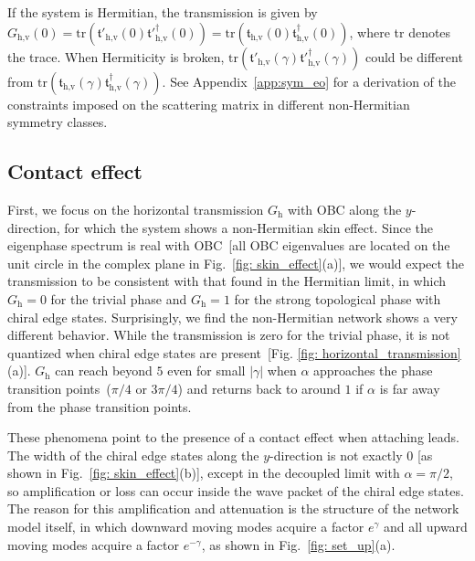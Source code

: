 \documentclass[aps,pra,reprint,superscriptaddress,showkeys,amsmath,amssymb,longbibliography]{revtex4-1}
\begin{document}
If the system is Hermitian, the transmission is given by $G_{\text{h,v}}(0)=\text{tr}(\mathfrak{t}'_{\text{h,v}}(0)\mathfrak{t}'^{\dagger}_{\text{h,v}}(0))=\text{tr}(\mathfrak{t}_{\text{h,v}}(0)\mathfrak{t}^{\dagger}_{\text{h,v}}(0))$, where tr denotes the trace.
When Hermiticity is broken, $\text{tr}(\mathfrak{t}'_{\text{h,v}}(\gamma)\mathfrak{t}'^{\dagger}_{\text{h,v}}(\gamma))$ could be different from $\text{tr}(\mathfrak{t}_{\text{h,v}}(\gamma)\mathfrak{t}^{\dagger}_{\text{h,v}}(\gamma))$.
See Appendix~\ref{app:sym_eo} for a derivation of the constraints imposed on the scattering matrix in different non-Hermitian symmetry classes.

\subsection{Contact effect}
\label{subsec:contact}

First, we focus on the horizontal transmission $G_{\text{h}}$ with OBC along the $y$-direction, for which the system shows a non-Hermitian skin effect.
Since the eigenphase spectrum is real with OBC~[all OBC eigenvalues are located on the unit circle in the complex plane in Fig.~\ref{fig: skin_effect}(a)], we would expect the transmission to be consistent with that found in the Hermitian limit, in which $G_{\text{h}}=0$ for the trivial phase and $G_{\text{h}}=1$ for the strong topological phase with chiral edge states.
Surprisingly, we find the non-Hermitian network shows a very different behavior.
While the transmission is zero for the trivial phase, it is not quantized when chiral edge states are present~[Fig. \ref{fig: horizontal_transmission}(a)].
$G_{\text{h}}$ can reach beyond $5$ even for small $|\gamma|$ when $\alpha$ approaches the phase transition points~($\pi/4$ or $3\pi/4$) and returns back to around $1$ if $\alpha$ is far away from the phase transition points.

These phenomena point to the presence of a contact effect when attaching leads.
The width of the chiral edge states along the $y$-direction is not exactly $0$ [as shown in Fig.~\ref{fig: skin_effect}(b)], except in the decoupled limit with $\alpha=\pi/2$, so amplification or loss can occur inside the wave packet of the chiral edge states.
The reason for this amplification and attenuation is the structure of the network model itself, in which downward moving modes acquire a factor $e^\gamma$ and all upward moving modes acquire a factor $e^{-\gamma}$, as shown in Fig.~\ref{fig: set_up}(a).
\end{document}
